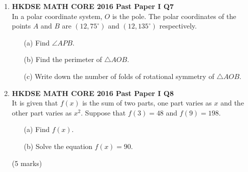 \documentclass[12pt]{article}
\begin{document}
\begin{enumerate}
	\item \textbf{HKDSE MATH CORE 2016 Past Paper I Q7}\\
	In a polar coordinate system, $O$ is the pole. The polar coordinates of the points $A$ and $B$ are $(12, 75^\circ)$ and $(12, 135^\circ)$ respectively.
	\begin{enumerate}
		\item[(a)] Find $\angle APB$.
		\item[(b)] Find the perimeter of $\triangle AOB$.
		\item[(c)] Write down the number of folds of rotational symmetry of $\triangle AOB$.
	\end{enumerate}
	
	\item \textbf{HKDSE MATH CORE 2016 Past Paper I Q8}\\
	It is given that $f(x)$ is the sum of two parts, one part varies as $x$ and the other part varies as $x^2$. Suppose that $f(3) = 48$ and $f(9) = 198$.
	\begin{enumerate}
		\item[(a)] Find $f(x)$.
		\item[(b)] Solve the equation $f(x) = 90$.
	\end{enumerate}
	(5 marks)	
	

\end{enumerate}
\end{document}
